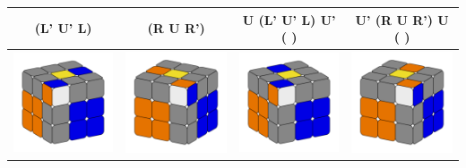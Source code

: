 \documentclass[12pt, a3paper]{article}
\newcommand{\scale}{1}
\begin{document}
\begin{center}
\begin{longtable}{c|c||c|c}
	(L' U' L) & (R U R') & U (L' U' L) U' ( ) & U' (R U R') U ( ) \\
	\hline
	\includegraphics[scale=\scale]{5l} & \includegraphics[scale=\scale]{5r}  &  \includegraphics[scale=\scale]{6l} & \includegraphics[scale=\scale]{6r} \\

\end{longtable}
\end{center}
\end{document}
